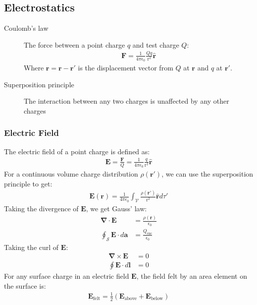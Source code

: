 \documentclass[11pt]{article}
\newcommand{\ve}[1]{\ensuremath{\bm{#1}}}			%
\newcommand{\dr}{\ensuremath{\text{r}}}				%
\newcommand{\dvr}{\ensuremath{\textbf{r}}}			%
\newcommand{\dvrhat}{\ensuremath{\ve{\hat{\dvr}}}}	%
\begin{document}
\begin{multicols*}{3}
\subsection{Electrostatics}
\begin{description}
\item[Coulomb's law] The force between a point charge $q$ and test charge $Q$:
	\begin{align*}
	\ve{F} =\frac{1}{4\pi\epsilon_0}\frac{Qq}{\dr^2}\dvrhat
	\end{align*}
Where $\dvr=\ve{r}-\ve{r'}$ is the displacement vector from $Q$ at $\ve{r}$ and $q$ at $\ve{r'}$.
\item[Superposition principle] The interaction between any two charges is unaffected by any other charges
\end{description}

\subsubsection{Electric Field}
The electric field of a point charge is defined as:
	\begin{align*}
	\ve{E}=\frac{\ve{F}}{Q}=\frac{1}{4\pi\epsilon_0}\frac{q}{\dr^2}\dvrhat
	\end{align*}
For a continuous volume charge distribution $\rho(\ve{r'})$, we can use the superposition principle to get:
	\begin{align*}
	\ve{E}(\ve{r})=\frac{1}{4\pi\epsilon_0}\int_\mathcal{V}\frac{\rho(\ve{r'})}{\dr^2}\dvrhat d\tau'
	\end{align*}
Taking the divergence of $\ve{E}$, we get Gauss' law:
	\begin{align*}
	\ve{\nabla}\cdot\ve{E}&=\frac{\rho{(\ve{r})}}{\epsilon_0}\\
	\oint_\mathcal{S}\ve{E}\cdot d\ve{a}&=\frac{Q_\text{enc}}{\epsilon_0}
	\end{align*}
Taking the curl of $\ve{E}$:
	\begin{align*}
	\ve{\nabla}\times\ve{E}&=0\\
	\oint\ve{E}\cdot d\ve{l}&=0
	\end{align*}
For any surface charge in an electric field $\ve{E}$, the field felt by an area element on the surface is:
	\begin{align*}
	\ve{E}_\text{felt}=\frac{1}{2}\left(\ve{E}_\text{above}+\ve{E}_\text{below}\right)
	\end{align*}

\end{multicols*}
\end{document}
